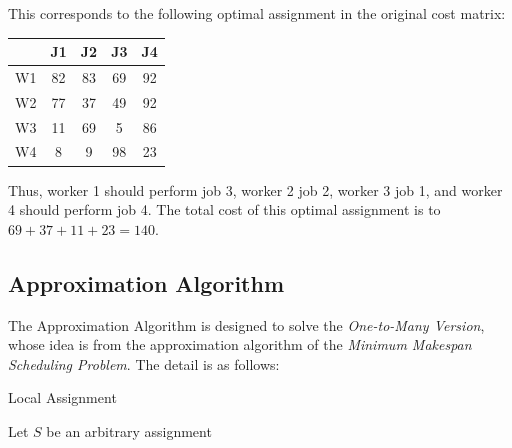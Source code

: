 \documentclass{llncs}
\begin{document}
This corresponds to the following optimal assignment in the original cost matrix:
\begin{table}[H]
  \centering
    \begin{tabular}{ccccc}
    \toprule
          & J1    & J2    & J3    & J4 \\
    \midrule
    \phantom{2333} W1 \phantom{2333}   & \phantom{2333} 82 \phantom{2333}   & \phantom{2333} 83 \phantom{2333}   & \cellcolor[rgb]{ 0,  .69,  .941}\phantom{2333} 69 \phantom{2333} & \phantom{2333} 92 \phantom{2333}\\
    W2    & 77    & \cellcolor[rgb]{ 0,  .69,  .941}37 & 49    & 92 \\
    W3    & \cellcolor[rgb]{ 0,  .69,  .941}11 & 69    & 5     & 86 \\
    W4    & 8     & 9     & 98    & \cellcolor[rgb]{ 0,  .69,  .941}23 \\
    \bottomrule
    \end{tabular}%
\end{table}%

Thus, worker 1 should perform job 3, worker 2 job 2, worker 3 job 1, and worker 4 should perform job 4. The total cost of this optimal assignment is to $69 + 37 + 11 + 23 = 140$.

\subsection{Approximation Algorithm}
The Approximation Algorithm is designed to solve the \textit{One-to-Many Version}, whose idea is from the approximation algorithm of the \textit{Minimum Makespan Scheduling Problem}. The detail is as follows:

\begin{minipage}[t]{0.8\textwidth}
\begin{algorithm}[H]
	\BlankLine
	\caption{Local Assignment}\label{Alg_Local_Assignment}
	\BlankLine
	Let $S$ be an arbitrary assignment\;
	
	
	\;
	
\end{algorithm}
\end{minipage}
\end{document}

